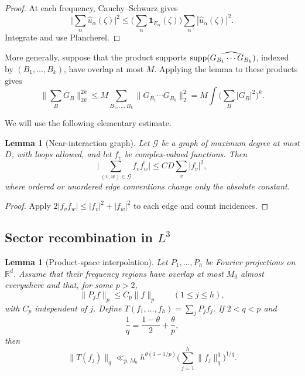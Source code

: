 \documentclass{amsart}
\numberwithin{equation}{section}
\newtheorem{lemma}[theorem]{Lemma}
\newcommand{\R}{\mathbb{R}}
\newcommand{\supp}{{\rm supp}}
\begin{document}
\begin{proof}
At each frequency, Cauchy--Schwarz gives
\[
 \Big|\sum_\alpha\widehat u_\alpha(\zeta)\Big|^2
 \le \Big(\sum_\alpha\mathbf{1}_{E_\alpha}(\zeta)\Big)
      \sum_\alpha|\widehat u_\alpha(\zeta)|^2.
\]
Integrate and use Plancherel.
\end{proof}

More generally, suppose that the product supports
$\supp(\widehat{G_{B_1}\cdots G_{B_k}})$, indexed by
$(B_1,\ldots,B_k)$, have overlap at most $M$.  Applying the lemma to these
products gives
\begin{equation}\label{eq:parabola-product-overlap}
 \Big\|\sum_B G_B\Big\|_{2k}^{2k}
 \le M\sum_{B_1,\ldots,B_k}
       \|G_{B_1}\cdots G_{B_k}\|_2^2
 =M\int\Big(\sum_B|G_B|^2\Big)^k.
\end{equation} 

\medskip 

We will use the following elementary estimate.

\begin{lemma}[Near-interaction graph]\label{lem:near-graph}
Let $\mathcal G$ be a graph of maximum degree at most $D$, with loops allowed,
and let $f_v$ be complex-valued functions.  Then
\[
 \Big|\sum_{(v,w)\in\mathcal G}f_v\overline{f_w}\Big|
 \le C D\sum_v|f_v|^2,
\]
where ordered or unordered edge conventions change only the absolute
constant.
\end{lemma}

\begin{proof}
Apply $2|f_vf_w|\le |f_v|^2+|f_w|^2$ to each edge and count incidences.
\end{proof}

\medskip 

\subsection{Sector recombination in \texorpdfstring{$L^3$}{L3}}


\begin{lemma}[Product-space interpolation]\label{lem:vector-interp}
Let $P_1,\ldots,P_h$ be Fourier projections on $\R^d$.  Assume that their
frequency regions have overlap at most $M_0$ almost everywhere and that,
for some $p>2$,
\[
 \|P_jf\|_p\le C_p\|f\|_p
 \qquad (1\le j\le h),
\]
with $C_p$ independent of $j$.  Define
$T(f_1,\ldots,f_h)=\sum_jP_jf_j$.  If $2<q<p$ and
\[
 \frac1q=\frac{1-\theta}{2}+\frac\theta p,
\]
then
\begin{equation}\label{eq:vector-interp}
 \|T(f_j)\|_q
 \ll_{p,M_0}h^{\theta(1-1/p)}
 \Big(\sum_{j=1}^h\|f_j\|_q^q\Big)^{1/q}.
\end{equation}
\end{lemma}
\end{document}
